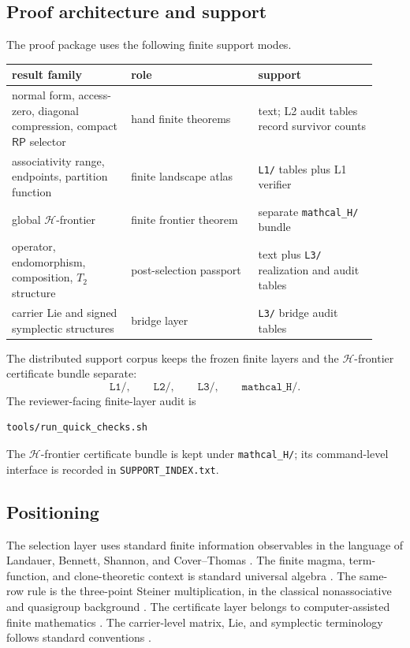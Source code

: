 \documentclass[11pt]{article}
\theoremstyle{definition}
\newcommand{\RP}{\mathsf{RP}}
\begin{document}
\subsection{Proof architecture and support}\label{proof-architecture-and-support}

The proof package uses the following finite support modes.

\begin{longtable}{@{}p{0.30\linewidth}p{0.32\linewidth}p{0.30\linewidth}@{}}
\toprule
result family & role & support \\
\midrule
\endhead
normal form, access-zero, diagonal compression, compact \(\RP\) selector & hand finite theorems & text; L2 audit tables record survivor counts \\
associativity range, endpoints, partition function & finite landscape atlas & \texttt{L1/} tables plus L1 verifier \\
global \(\mathcal H\)-frontier & finite frontier theorem & separate \texttt{mathcal\_H/} bundle \\
operator, endomorphism, composition, \(T_2\) structure & post-selection passport & text plus \texttt{L3/} realization and audit tables \\
carrier Lie and signed symplectic structures & bridge layer & \texttt{L3/} bridge audit tables \\
\bottomrule
\end{longtable}

The distributed support corpus keeps the frozen finite layers and the
\(\mathcal H\)-frontier certificate bundle separate:
\[
\texttt{L1/},
\qquad
\texttt{L2/},
\qquad
\texttt{L3/},
\qquad
\texttt{mathcal\_H/}.
\]
The reviewer-facing finite-layer audit is
\begin{verbatim}
tools/run_quick_checks.sh
\end{verbatim}
The \(\mathcal H\)-frontier certificate bundle is kept under
\texttt{mathcal\_H/}; its command-level interface is recorded in
\texttt{SUPPORT\_INDEX.txt}.

\subsection{Positioning}\label{positioning}

The selection layer uses standard finite information observables in the
language of Landauer, Bennett, Shannon, and Cover--Thomas
\cite{Landauer1961,Bennett1973,Bennett1982,Shannon1948,CoverThomas2006}.
The finite magma, term-function, and clone-theoretic context is standard
universal algebra
\cite{Birkhoff1935,Cohn1965,BurrisSankappanavar1981,Post1941,Rosenberg1970,Szendrei1986,Lau2006}.
The same-row rule is the three-point Steiner multiplication, in the
classical nonassociative and quasigroup background
\cite{Bruck1958,DenesKeedwell1974,Pflugfelder1990,ColbournDinitz2007}.
The certificate layer belongs to computer-assisted finite mathematics
\cite{AppelHaken1977,AppelHakenKoch1977,Gonthier2008,McCune1997,Hales2005,HalesEtAl2017}.
The carrier-level matrix, Lie, and symplectic terminology follows standard
conventions
\cite{HornJohnson2012,FultonHarris1991,Hall2015,GuilleminSternberg1990,McDuffSalamon2017}.
\end{document}
